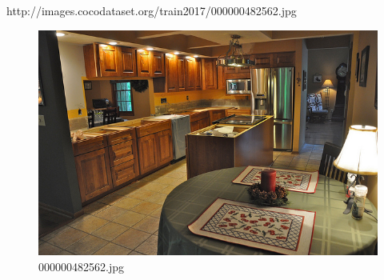 http://images.cocodataset.org/train2017/000000482562.jpg
\begin{figure}[h]
    \centering
    \includegraphics[width=0.8\linewidth]{../image set/hard/000000482562.jpg}
    \caption{000000482562.jpg}
\end{figure}
